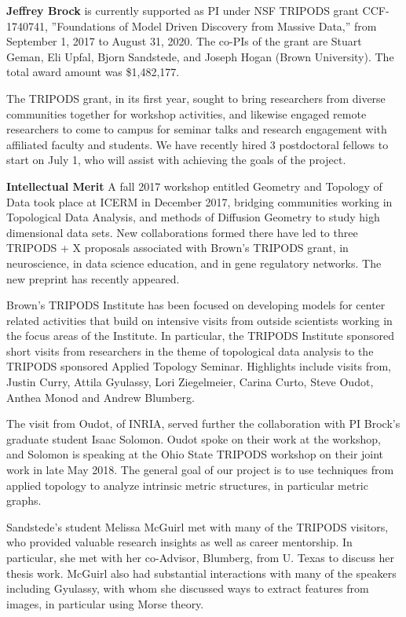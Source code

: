 

\textbf{Jeffrey Brock} is currently supported as PI under NSF TRIPODS grant CCF-1740741, ''Foundations of Model Driven Discovery from Massive Data,'' from September 1, 2017 to August 31, 2020. The co-PIs of the grant are Stuart Geman, Eli Upfal, Bjorn Sandstede, and Joseph Hogan (Brown University). The total award amount was \$1,482,177.

The TRIPODS grant, in its first year, sought to bring researchers from diverse communities together for workshop activities, and likewise engaged remote researchers to come to campus for seminar talks and research engagement with affiliated faculty and students. We have recently hired 3 postdoctoral fellows to start on July 1, who will assist with achieving the goals of the project.

\textbf{Intellectual Merit} A fall 2017 workshop entitled Geometry and Topology of Data took place at ICERM in December 2017, bridging communities working in Topological Data Analysis, and methods of Diffusion Geometry to study high dimensional data sets. New collaborations formed there have led to three  TRIPODS + X proposals associated with Brown's TRIPODS grant, in neuroscience, in data science education, and in gene regulatory networks. The new preprint \citep{Oudot:Solomon:persistence} has recently appeared.

Brown's TRIPODS Institute has been focused on developing models for center related activities that build on intensive visits from outside scientists working in the focus areas of the Institute. In particular, the TRIPODS Institute sponsored short visits from researchers in the theme of topological data analysis to the TRIPODS sponsored Applied Topology Seminar. Highlights include visits from, Justin Curry, Attila Gyulassy, Lori Ziegelmeier, Carina Curto, Steve Oudot, Anthea Monod and Andrew Blumberg.

The visit from Oudot, of INRIA, served further the collaboration with PI Brock's graduate student Isaac Solomon. Oudot spoke on their work at the workshop, and Solomon is speaking at the Ohio State TRIPODS workshop on their joint work in late May 2018. The general goal of our project is to use techniques from applied topology to analyze intrinsic metric structures, in particular metric graphs.

Sandstede's student Melissa McGuirl met with many of the TRIPODS visitors, who provided valuable research insights as well as career mentorship. In particular, she met with her co-Advisor, Blumberg, from U. Texas to discuss her thesis work. McGuirl also had substantial interactions with many of the speakers including Gyulassy, with whom she discussed ways to extract features from images, in particular using Morse theory. 

